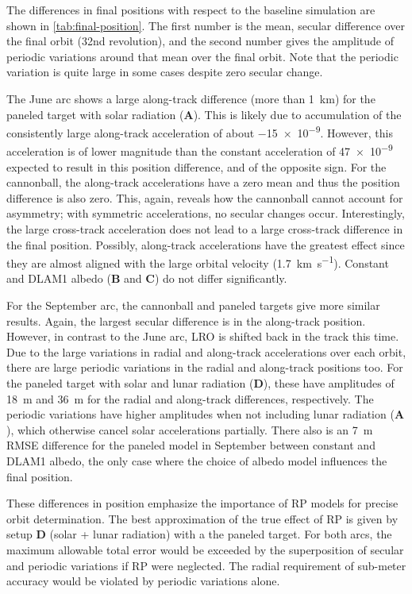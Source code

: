 The differences in final positions with respect to the baseline simulation are shown in \cref{tab:final-position}. The first number is the mean, secular difference over the final orbit (32nd revolution), and the second number gives the amplitude of periodic variations around that mean over the final orbit. Note that the periodic variation is quite large in some cases despite zero secular change.

The June arc shows a large along-track difference (more than \qty{1}{\km}) for the paneled target with solar radiation ($\mathbf{A}$). This is likely due to accumulation of the consistently large along-track acceleration of about \qty{-15e-9}{\acc}. However, this acceleration is of lower magnitude than the constant acceleration of \qty{+47e-9}{\acc} expected to result in this position difference, and of the opposite sign. For the cannonball, the along-track accelerations have a zero mean and thus the position difference is also zero. This, again, reveals how the cannonball cannot account for asymmetry; with symmetric accelerations, no secular changes occur. Interestingly, the large cross-track acceleration does not lead to a large cross-track difference in the final position. Possibly, along-track accelerations have the greatest effect since they are almost aligned with the large orbital velocity (\qty{1.7}{\km\per\s}). Constant and \gls{DLAM1} albedo ($\mathbf{B}$ and $\mathbf{C}$) do not differ significantly.

For the September arc, the cannonball and paneled targets give more similar results. Again, the largest secular difference is in the along-track position. However, in contrast to the June arc, \gls{LRO} is shifted back in the track this time. Due to the large variations in radial and along-track accelerations over each orbit, there are large periodic variations in the radial and along-track positions too. For the paneled target with solar and lunar radiation ($\mathbf{D}$), these have amplitudes of \qty{18}{\m} and \qty{36}{\m} for the radial and along-track differences, respectively. The periodic variations have higher amplitudes when not including lunar radiation ($\mathbf{A}$), which otherwise cancel solar accelerations partially. There also is an \qty{7}{m} RMSE difference for the paneled model in September between constant and \gls{DLAM1} albedo, the only case where the choice of albedo model influences the final position.


These differences in position emphasize the importance of \gls{RP} models for precise orbit determination. The best approximation of the true effect of \gls{RP} is given by setup $\mathbf{D}$ (solar + lunar radiation) with a the paneled target. For both arcs, the maximum allowable total error would be exceeded by the superposition of secular and periodic variations if \gls{RP} were neglected. The radial requirement of sub-meter accuracy would be violated by periodic variations alone.




